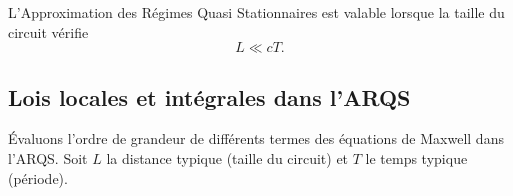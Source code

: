 \documentclass[12pt,fancy]{cours}
\begin{document}
\begin{prop}[ARQS]\label{prop:}
  L’Approximation des Régimes Quasi Stationnaires  est valable lorsque la taille du circuit vérifie
  \begin{equation*}
  L\ll cT.
  \end{equation*}
\end{prop}






\subsection{Lois locales et intégrales dans l’ARQS}

 Évaluons l’ordre de grandeur de différents termes des équations de Maxwell dans l’ARQS. Soit $L$ la distance typique (taille du circuit) et $T$ le temps typique  (période).
\end{document}
